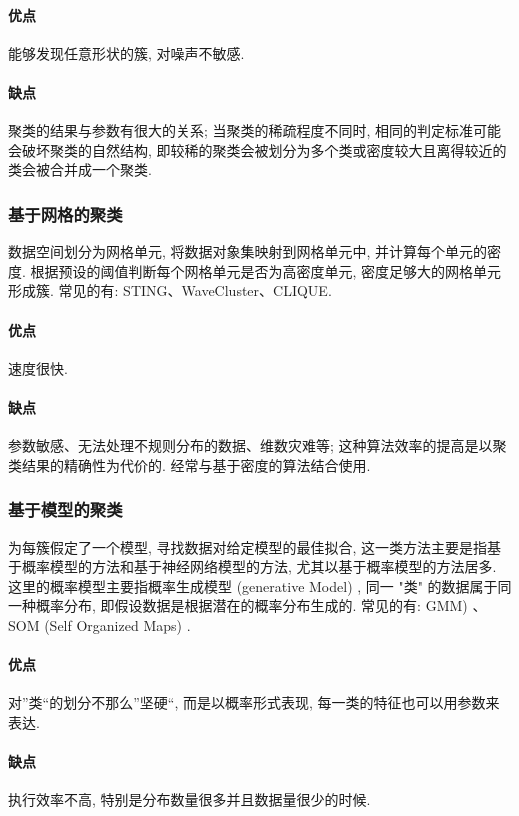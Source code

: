 \paragraph{优点}能够发现任意形状的簇, 对噪声不敏感. 

\paragraph{缺点}聚类的结果与参数有很大的关系; 当聚类的稀疏程度不同时, 相同的判定标准可能会破坏聚类的自然结构, 即较稀的聚类会被划分为多个类或密度较大且离得较近的类会被合并成一个聚类. 
	
\subsubsection{基于网格的聚类}
数据空间划分为网格单元, 将数据对象集映射到网格单元中, 并计算每个单元的密度. 根据预设的阈值判断每个网格单元是否为高密度单元, 密度足够大的网格单元形成簇. 常见的有: STING、WaveCluster、CLIQUE. 

\paragraph{优点}速度很快. 

\paragraph{缺点}参数敏感、无法处理不规则分布的数据、维数灾难等; 这种算法效率的提高是以聚类结果的精确性为代价的. 经常与基于密度的算法结合使用. 
	
\subsubsection{基于模型的聚类}
为每簇假定了一个模型, 寻找数据对给定模型的最佳拟合, 这一类方法主要是指基于概率模型的方法和基于神经网络模型的方法, 尤其以基于概率模型的方法居多. 这里的概率模型主要指概率生成模型 (generative Model) , 同一 "类" 的数据属于同一种概率分布, 即假设数据是根据潜在的概率分布生成的. 常见的有: GMM) 、SOM (Self Organized Maps) . 

\paragraph{优点}对”类“的划分不那么”坚硬“, 而是以概率形式表现, 每一类的特征也可以用参数来表达. 

\paragraph{缺点}执行效率不高, 特别是分布数量很多并且数据量很少的时候. 

